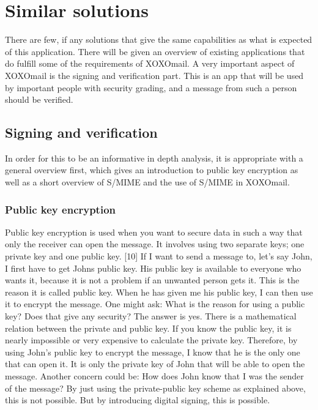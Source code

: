 \section{Similar solutions}
There are few, if any solutions that give the same capabilities as what is expected of this application. There will be given an overview of existing applications that do fulfill some of the requirements of XOXOmail.
\newline
\newline
A very important aspect of XOXOmail is the signing and verification part. This is an app that will be used by important people with security grading, and a message from such a person should be verified.

\subsection{Signing and verification}
In order for this to be an informative in depth analysis, it is appropriate with a general overview first, which gives an introduction to public key encryption as well as a short overview of S/MIME and the use of S/MIME in XOXOmail.

\subsubsection{Public key encryption}
Public key encryption is used when you want to secure data in such a way that only the receiver can open the message. It involves using two separate keys; one private key and one public key. [10]
\newline
\newline
If I want to send a message to, let's say John, I first have to get Johns public key. His public key is available to everyone who wants it, because it is not a problem if an unwanted person gets it. This is the reason it is called public key. When he has given me his public key, I can then use it to encrypt the message. One might ask: What is the reason for using a
public key? Does that give any security? The answer is yes. There is a mathematical relation between the private and public key. If you know the public key, it is nearly impossible or very expensive to calculate the private key. Therefore, by using John's public key to encrypt the message, I know that he is the only one that can open it. It is only the private key of John that will be able to open the message.
\newline
\newline
Another concern could be: How does John know that I was the sender of the message? By just using the private-public key scheme as explained above, this is not possible. But by introducing digital signing, this is possible.

